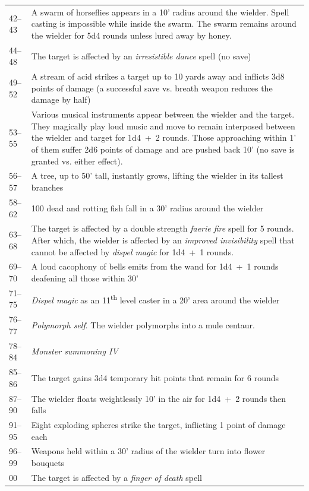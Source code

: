 \begin{longtable}{|p{}|p{}|}
\rowcolor[gray]{.9}42--43	& A swarm of horseflies appears in a 10' radius around the wielder.  Spell casting is impossible while inside the swarm.  The swarm remains around the wielder for 5d4 rounds unless lured away by honey. \\
44--48	& The target is affected by an \textit{irresistible dance} spell (no save)  \\
\rowcolor[gray]{.9}49--52	& A stream of acid strikes a target up to 10 yards away and inflicts 3d8 points of damage (a successful save vs. breath weapon reduces the damage by half) \\
53--55	& Various musical instruments appear between the wielder and the target.  They magically play loud music and move to remain interposed between the wielder and target for 1d4~+~2 rounds.  Those approaching within 1' of them suffer 2d6 points of damage and are pushed back 10' (no save is granted vs. either effect). \\
\rowcolor[gray]{.9}56--57	& A tree, up to 50' tall, instantly grows, lifting the wielder in its tallest branches  \\
58--62	& 100 dead and rotting fish fall in a 30' radius around the wielder  \\
\rowcolor[gray]{.9}63--68	& The target is affected by a double strength \textit{faerie fire} spell for 5 rounds.  After which, the wielder is affected by an \textit{improved invisibility} spell that cannot be affected by \textit{dispel magic} for 1d4~+~1 rounds. \\
69--70	& A loud cacophony of bells emits from the wand for 1d4~+~1 rounds deafening all those within 30' \\
\rowcolor[gray]{.9}71--75	& \textit{Dispel magic} as an 11\textsuperscript{th} level caster in a 20' area around the wielder \\
76--77	& \textit{Polymorph self}.  The wielder polymorphs into a mule centaur. \\
\rowcolor[gray]{.9}78--84	& \textit{Monster summoning IV} \\
85--86	& The target gains 3d4 temporary hit points that remain for 6 rounds \\
\rowcolor[gray]{.9}87--90	& The wielder floats weightlessly 10' in the air for 1d4~+~2 rounds then falls \\
91--95	& Eight exploding spheres strike the target, inflicting 1 point of damage each \\ 
\rowcolor[gray]{.9}96--99	& Weapons held within a 30' radius of the wielder turn into flower bouquets \\
00	& The target is affected by a \textit{finger of death} spell \\
\end{longtable}

